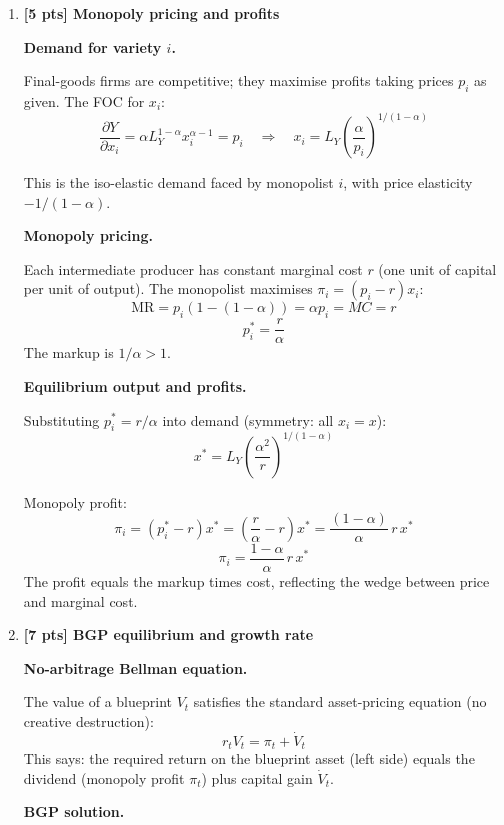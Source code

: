 \documentclass[a4paper,11pt]{article}
\begin{document}
\bigskip
\begin{enumerate}[label=\textbf{(\arabic*)},leftmargin=*]

\item \textbf{[5 pts] Monopoly pricing and profits}

\begin{answerbox}
\textbf{Demand for variety $i$.}

Final-goods firms are competitive; they maximise profits taking prices $p_i$ as given. The FOC for $x_i$:
\[
  \frac{\partial Y}{\partial x_i} = \alpha L_Y^{1-\alpha} x_i^{\alpha-1} = p_i \quad \Longrightarrow \quad x_i = L_Y \left(\frac{\alpha}{p_i}\right)^{1/(1-\alpha)}
\]

This is the iso-elastic demand faced by monopolist $i$, with price elasticity $-1/(1-\alpha)$.

\textbf{Monopoly pricing.}

Each intermediate producer has constant marginal cost $r$ (one unit of capital per unit of output). The monopolist maximises $\pi_i = (p_i - r)x_i$:
\[
  \text{MR} = p_i\left(1 - (1-\alpha)\right) = \alpha p_i = MC = r
\]
\[
  \boxed{p_i^* = \frac{r}{\alpha}}
\]
The markup is $1/\alpha > 1$.

\textbf{Equilibrium output and profits.}

Substituting $p_i^* = r/\alpha$ into demand (symmetry: all $x_i = x$):
\[
  x^* = L_Y \left(\frac{\alpha^2}{r}\right)^{1/(1-\alpha)}
\]

Monopoly profit:
\[
  \pi_i = (p_i^* - r)x^* = \left(\frac{r}{\alpha} - r\right)x^* = \frac{(1-\alpha)}{\alpha}\,r\,x^*
\]
\[
  \boxed{\pi_i = \frac{1-\alpha}{\alpha}\,r\,x^*}
\]
The profit equals the markup times cost, reflecting the wedge between price and marginal cost.
\end{answerbox}

\bigskip

\item \textbf{[7 pts] BGP equilibrium and growth rate}

\begin{answerbox}
\textbf{No-arbitrage Bellman equation.}

The value of a blueprint $V_t$ satisfies the standard asset-pricing equation (no creative destruction):
\[
  r_t V_t = \pi_t + \dot{V}_t
\]
This says: the required return on the blueprint asset (left side) equals the dividend (monopoly profit $\pi_t$) plus capital gain $\dot{V}_t$.

\textbf{BGP solution.}


\end{answerbox}
\end{enumerate}
\end{document}
